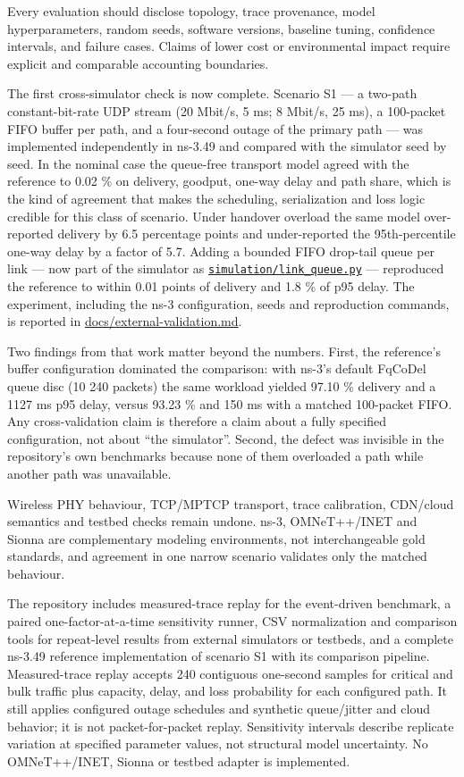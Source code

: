 \documentclass[
  american,
  11pt,
]{article}
\newcounter{none} %
\begin{document}
Every evaluation should disclose topology, trace provenance, model
hyperparameters, random seeds, software versions, baseline tuning,
confidence intervals, and failure cases. Claims of lower cost or
environmental impact require explicit and comparable accounting
boundaries.

The first cross-simulator check is now complete. Scenario S1 --- a
two-path constant-bit-rate UDP stream (20 Mbit/s, 5 ms; 8 Mbit/s, 25
ms), a 100-packet FIFO buffer per path, and a four-second outage of the
primary path --- was implemented independently in ns-3.49 and compared
with the simulator seed by seed. In the nominal case the queue-free
transport model agreed with the reference to 0.02 \% on delivery,
goodput, one-way delay and path share, which is the kind of agreement
that makes the scheduling, serialization and loss logic credible for
this class of scenario. Under handover overload the same model
over-reported delivery by 6.5 percentage points and under-reported the
95th-percentile one-way delay by a factor of 5.7. Adding a bounded FIFO
drop-tail queue per link --- now part of the simulator as
\href{../simulation/link_queue.py}{\texttt{simulation/link\_queue.py}}
--- reproduced the reference to within 0.01 points of delivery and 1.8
\% of p95 delay. The experiment, including the ns-3 configuration, seeds
and reproduction commands, is reported in
\href{../docs/external-validation.md}{docs/external-validation.md}.

Two findings from that work matter beyond the numbers. First, the
reference's buffer configuration dominated the comparison: with ns-3's
default FqCoDel queue disc (10 240 packets) the same workload yielded
97.10 \% delivery and a 1127 ms p95 delay, versus 93.23 \% and 150 ms
with a matched 100-packet FIFO. Any cross-validation claim is therefore
a claim about a fully specified configuration, not about ``the
simulator''. Second, the defect was invisible in the repository's own
benchmarks because none of them overloaded a path while another path was
unavailable.

Wireless PHY behaviour, TCP/MPTCP transport, trace calibration,
CDN/cloud semantics and testbed checks remain undone. ns-3, OMNeT++/INET
and Sionna are complementary modeling environments, not interchangeable
gold standards, and agreement in one narrow scenario validates only the
matched behaviour.

The repository includes measured-trace replay for the event-driven
benchmark, a paired one-factor-at-a-time sensitivity runner, CSV
normalization and comparison tools for repeat-level results from
external simulators or testbeds, and a complete ns-3.49 reference
implementation of scenario S1 with its comparison pipeline.
Measured-trace replay accepts 240 contiguous one-second samples for
critical and bulk traffic plus capacity, delay, and loss probability for
each configured path. It still applies configured outage schedules and
synthetic queue/jitter and cloud behavior; it is not packet-for-packet
replay. Sensitivity intervals describe replicate variation at specified
parameter values, not structural model uncertainty. No OMNeT++/INET,
Sionna or testbed adapter is implemented.
\end{document}
